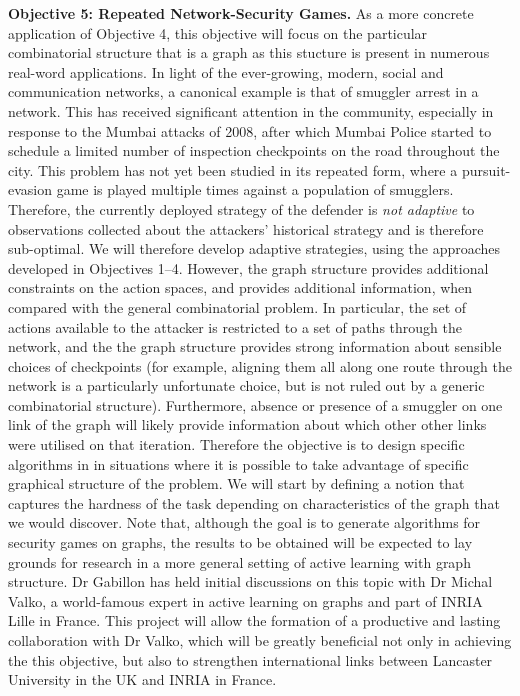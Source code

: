 \textbf{Objective 5:  Repeated Network-Security Games.}
As a more concrete application of Objective 4, this objective will focus on the particular combinatorial structure that is a graph as this stucture is present in  numerous real-word applications.
In light of the ever-growing, modern, social and communication networks, a canonical example is that of smuggler arrest in a network\cite{jain2011double}. This has received significant attention in the community, especially in  response  to  the  Mumbai  attacks  of  2008, after which  Mumbai  Police
started to schedule a limited number of inspection checkpoints
on the road throughout the city.
This problem has not yet been studied in its repeated form, where a pursuit-evasion game is played multiple times against a population of smugglers. Therefore, the currently deployed strategy of the defender is \textit{not adaptive} to observations collected about the attackers' historical strategy and is therefore sub-optimal.  We will therefore develop adaptive strategies, using the approaches developed in Objectives 1--4.  However, the graph structure provides additional constraints on the action spaces, and provides additional information, when compared with the general combinatorial problem.  In particular, the set of actions available to the attacker is restricted to a set of paths through the network, and the the graph structure provides strong information about sensible choices of checkpoints (for example, aligning them all along one route through the network is a particularly unfortunate choice, but is not ruled out by a generic combinatorial structure).  Furthermore, absence or presence of a smuggler on one link of the graph will likely provide information about which other other links were utilised on that iteration. Therefore the objective  is to design specific algorithms in in situations where it is possible to take advantage of specific graphical structure of the problem. We will start by defining a notion that captures the hardness of the task depending on characteristics of the graph that we would discover. Note that, although the goal is to generate algorithms for security games on graphs, the results to be obtained will be expected to lay grounds for research in a more general setting of active learning with graph structure. Dr Gabillon has held initial discussions on this topic with Dr Michal Valko, a world-famous expert in active learning on graphs and part of INRIA Lille in France. This project will allow the formation of a productive and lasting collaboration with Dr Valko, which will be greatly beneficial not only in achieving the this objective, but also to strengthen international links between Lancaster University in the UK and INRIA in France.  
 

